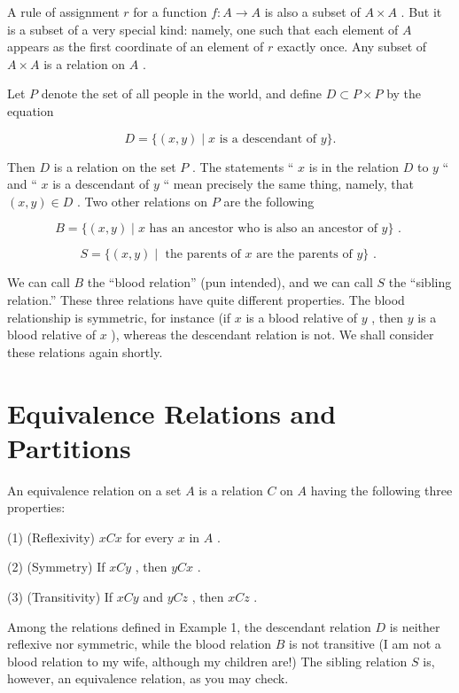 A rule of assignment \(r\) for a function \(f : A \rightarrow  A\) is also a subset of \(A \times  A\) . But it is a subset of a very special kind: namely, one such that each element of \(A\) appears as the first coordinate of an element of \(r\) exactly once. Any subset of \(A \times  A\) is a relation on \(A\) .

\begin{centeredblock}
\begin{example} Let \(P\) denote the set of all people in the world, and define \(D \subset  P \times  P\) by the equation

\[
D = \{ \left( {x,y}\right)  \mid  x\text{ is a descendant of }y\} .
\]

Then \(D\) is a relation on the set \(P\) . The statements `` \(x\) is in the relation \(D\) to \(y\) `` and `` \(x\) is a descendant of \(y\) `` mean precisely the same thing, namely, that \(\left( {x,y}\right)  \in  D\) . Two other relations on \(P\) are the following

\[
B = \{ \left( {x,y}\right)  \mid  x\text{ has an ancestor who is also an ancestor of }y\} \text{ . }
\]

\[
S = \{ \left( {x,y}\right)  \mid  \text{ the parents of }x\text{ are the parents of }y\} \text{ . }
\]

We can call \(B\) the ``blood relation'' (pun intended), and we can call \(S\) the ``sibling relation.'' These three relations have quite different properties. The blood relationship is symmetric, for instance (if \(x\) is a blood relative of \(y\) , then \(y\) is a blood relative of \(x\) ), whereas the descendant relation is not. We shall consider these relations again shortly.
\end{example}
\end{centeredblock}

\section*{Equivalence Relations and Partitions}

An equivalence relation on a set \(A\) is a relation \(C\) on \(A\) having the following three properties:

(1) (Reflexivity) \({xCx}\) for every \(x\) in \(A\) .

(2) (Symmetry) If \({xCy}\) , then \({yCx}\) .

(3) (Transitivity) If \({xCy}\) and \({yCz}\) , then \({xCz}\) .

\begin{centeredblock}
\begin{example} Among the relations defined in Example 1, the descendant relation \(D\) is neither reflexive nor symmetric, while the blood relation \(B\) is not transitive (I am not a blood relation to my wife, although my children are!) The sibling relation \(S\) is, however, an equivalence relation, as you may check.
\end{example}
\end{centeredblock}

